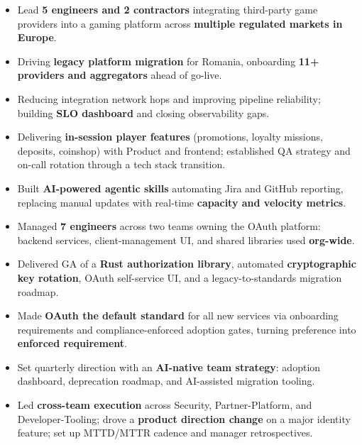 \documentclass[10pt,a4paper,ragged2e,withhyper]{altacv}
\begin{document}
\begin{itemize}
\item Lead \textbf{5 engineers and 2 contractors} integrating third-party game providers into a gaming platform across \textbf{multiple regulated markets in Europe}.
\item Driving \textbf{legacy platform migration} for Romania, onboarding \textbf{11+ providers and aggregators} ahead of go-live.
\item Reducing integration network hops and improving pipeline reliability; building \textbf{SLO dashboard} and closing observability gaps.
\item Delivering \textbf{in-session player features} (promotions, loyalty missions, deposits, coinshop) with Product and frontend; established QA strategy and on-call rotation through a tech stack transition.
\item Built \textbf{AI-powered agentic skills} automating Jira and GitHub reporting, replacing manual updates with real-time \textbf{capacity and velocity metrics}.
\end{itemize}

\divider

\begin{itemize}
\item Managed \textbf{7 engineers} across two teams owning the OAuth platform: backend services, client-management UI, and shared libraries used \textbf{org-wide}.
\item Delivered GA of a \textbf{Rust authorization library}, automated \textbf{cryptographic key rotation}, OAuth self-service UI, and a legacy-to-standards migration roadmap.
\item Made \textbf{OAuth the default standard} for all new services via onboarding requirements and compliance-enforced adoption gates, turning preference into \textbf{enforced requirement}.
\item Set quarterly direction with an \textbf{AI-native team strategy}: adoption dashboard, deprecation roadmap, and AI-assisted migration tooling.
\item Led \textbf{cross-team execution} across Security, Partner-Platform, and Developer-Tooling; drove a \textbf{product direction change} on a major identity feature; set up MTTD/MTTR cadence and manager retrospectives.
\end{itemize}
\end{document}
